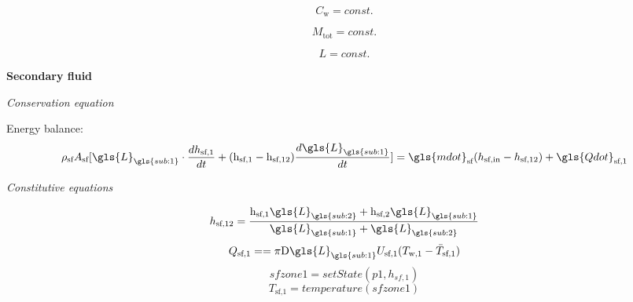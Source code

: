 \documentclass[11pt]{article} %
\begin{document}
\begin{equation}
C_\text{w} = const.
\end{equation}

\begin{equation}
M_\text{tot} = const.
\end{equation}

\begin{equation}
L= const.
\end{equation}

{\bf Secondary fluid}\\
\begin{center}
\textit{Conservation equation}\\
\end{center}


Energy balance:\\
\begin{equation}
\rho_\text{sf} A_\text{sf} [\gls{L}_{\gls{sub:1}} \cdot  \frac{d h_\text{sf,1}}{d t} +  (\text{h}_\text{sf,1} - \text{h}_\text{sf,12})  \frac{d \gls{L}_{\gls{sub:1}}}{d t}] = \gls{mdot}_\text{sf} ({h}_\text{sf,in} - h_\text{sf,12} ) + \gls{Qdot}_\text{sf,1} 
\end{equation}

\begin{center}
\textit{Constitutive equations}\\
\end{center}
\begin{equation}
h_\text{sf,12} = \frac{   \text{h}_\text{sf,1} \gls{L}_{\gls{sub:2}}  + \text{h}_\text{sf,2}\gls{L}_{\gls{sub:1}}      }{  \gls{L}_{\gls{sub:1}} + \gls{L}_{\gls{sub:2}}         } 
\end{equation}
\begin{equation}
{Q}_\text{sf,1} = = \pi \text{D} \gls{L}_{\gls{sub:1}} U_\text{sf,1} (T_\text{w,1} - \bar{T}_\text{sf,1})
\end{equation}
\begin{equation}
sfzone1 = setState(p1,h_{sf,1})
\end{equation}
\begin{equation}
T_\text{sf,1} = temperature(sfzone1)
\end{equation}\\
\end{document}
